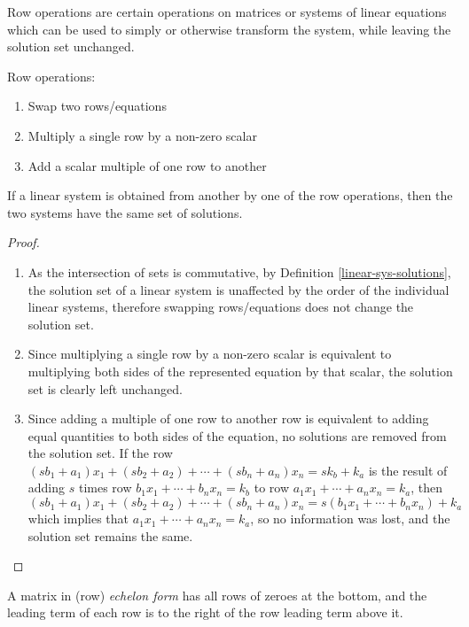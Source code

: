 Row operations are certain operations on matrices or systems of linear equations which can be used to simply or otherwise transform the system, while leaving the solution set unchanged.

\begin{defn}\label{row-op}
    Row operations: \begin{enumerate}
        \item Swap two rows/equations
        \item Multiply a single row by a non-zero scalar
        \item Add a scalar multiple of one row to another
    \end{enumerate}
\end{defn}

\begin{thm}\label{solutions-unchanged-by-row-ops}
    If a linear system is obtained from another by one of the row operations, then the two systems have the same set of solutions.
\end{thm}

\begin{proof}\proofbreak
    \begin{enumerate}
        \item As the intersection of sets is commutative, by Definition \ref{linear-sys-solutions}, the solution set of a linear system is unaffected by the order of the individual linear systems, therefore swapping rows/equations does not change the solution set.
        \item Since multiplying a single row by a non-zero scalar is equivalent to multiplying both sides of the represented equation by that scalar, the solution set is clearly left unchanged.
        \item Since adding a multiple of one row to another row is equivalent to adding equal quantities to both sides of the equation, no solutions are removed from the solution set. If the row $(sb_1 + a_1)x_1 + (sb_2 + a_2) + \cdots + (sb_n + a_n)x_n = sk_b + k_a$ is the result of adding $s$ times row $b_1x_1 + \cdots + b_nx_n = k_b$ to row $a_1x_1 + \cdots + a_nx_n = k_a$, then $(sb_1 + a_1)x_1 + (sb_2 + a_2) + \cdots + (sb_n + a_n)x_n = s(b_1x_1 + \cdots + b_nx_n) + k_a$  which implies that $a_1x_1 + \cdots + a_nx_n = k_a$, so no information was lost, and the solution set remains the same.
    \end{enumerate}
\end{proof}

\begin{defn}
    A matrix in (row) \emph{echelon form} has all rows of zeroes at the bottom, and the leading term of each row is to the right of the row leading term above it.
\end{defn}

